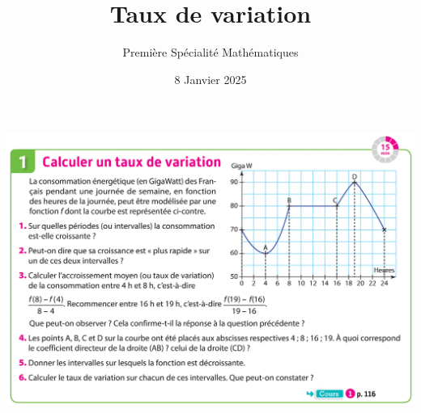 \documentclass{article}
\title{Taux de variation}
\date{8 Janvier 2025}
\author{Première Spécialité Mathématiques}
\begin{document}
\maketitle
\includegraphics[width=\textwidth]{Taux_Variation_activite.png}
\end{document}
